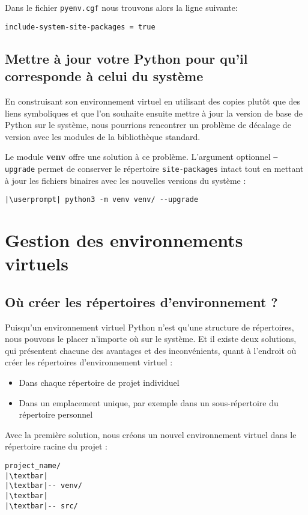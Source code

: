 Dans le fichier \texttt{pyenv.cgf} nous trouvons alors la ligne suivante:
\begin{lstlisting}[style=file]
include-system-site-packages = true
\end{lstlisting}

\subsection*{Mettre à jour votre Python pour qu'il corresponde à celui du système}
En construisant son environnement virtuel en utilisant des copies plutôt que des liens symboliques et que l'on souhaite ensuite mettre à jour la version de base de Python sur le système, nous pourrions rencontrer un problème de décalage de version avec les modules de la bibliothèque standard.

Le module \textbf{venv} offre une solution à ce problème. L'argument optionnel \texttt{--upgrade} permet de conserver le répertoire \texttt{site-packages} intact tout en mettant à jour les fichiers binaires avec les nouvelles versions du système :
\begin{lstlisting}[style=bash]
|\userprompt| python3 -m venv venv/ --upgrade
\end{lstlisting}

\section{Gestion des environnements virtuels}
\subsection*{Où créer les répertoires d'environnement ?}
Puisqu'un environnement virtuel Python n'est qu'une structure de répertoires, nous pouvons le placer n'importe où sur le système. Et il existe deux solutions, qui présentent chacune des avantages et des inconvénients, quant à l'endroit où créer les répertoires d'environnement virtuel :

\begin{itemize}
    \item Dans chaque répertoire de projet individuel
    \item Dans un emplacement unique, par exemple dans un sous-répertoire du répertoire personnel
\end{itemize}

Avec la première solution, nous créons un nouvel environnement virtuel dans le répertoire racine du projet :
\begin{lstlisting}[style=tree]
project_name/
|\textbar|
|\textbar|-- venv/
|\textbar|
|\textbar|-- src/
\end{lstlisting}

